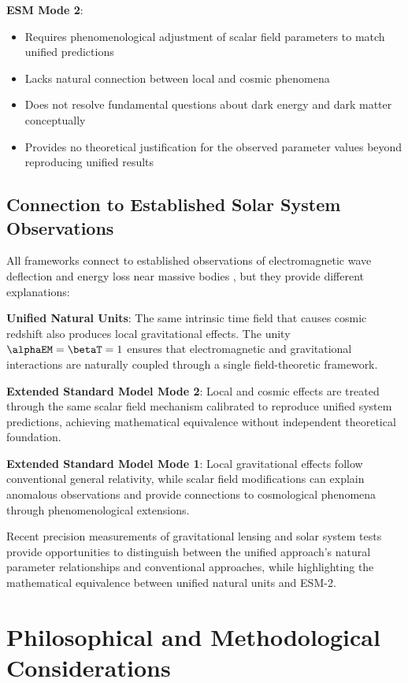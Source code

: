 	\textbf{ESM Mode 2}:
	\begin{itemize}
		\item Requires phenomenological adjustment of scalar field parameters to match unified predictions
		\item Lacks natural connection between local and cosmic phenomena
		\item Does not resolve fundamental questions about dark energy and dark matter conceptually
		\item Provides no theoretical justification for the observed parameter values beyond reproducing unified results
	\end{itemize}
	
	\subsection{Connection to Established Solar System Observations}
	\label{subsec:solar_system_observations}
	
	All frameworks connect to established observations of electromagnetic wave deflection and energy loss near massive bodies \cite{Adams1925,Pound1960,Bertotti2003,Shapiro1971}, but they provide different explanations:
	
	\textbf{Unified Natural Units}: The same intrinsic time field that causes cosmic redshift also produces local gravitational effects. The unity $\alphaEM = \betaT = 1$ ensures that electromagnetic and gravitational interactions are naturally coupled through a single field-theoretic framework.
	
	\textbf{Extended Standard Model Mode 2}: Local and cosmic effects are treated through the same scalar field mechanism calibrated to reproduce unified system predictions, achieving mathematical equivalence without independent theoretical foundation.
	
	\textbf{Extended Standard Model Mode 1}: Local gravitational effects follow conventional general relativity, while scalar field modifications can explain anomalous observations and provide connections to cosmological phenomena through phenomenological extensions.
	
	Recent precision measurements of gravitational lensing and solar system tests \cite{Bolton2008,Suyu2017} provide opportunities to distinguish between the unified approach's natural parameter relationships and conventional approaches, while highlighting the mathematical equivalence between unified natural units and ESM-2.
	
	\section{Philosophical and Methodological Considerations}
	\label{sec:philosophical_considerations}
	
